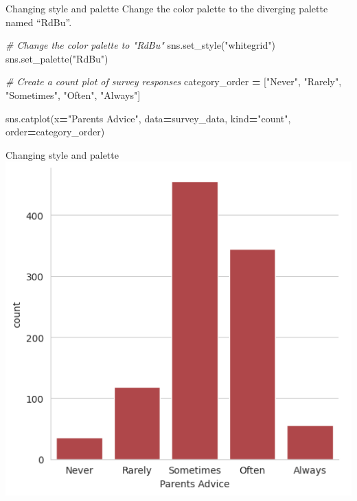\documentclass[
  ignorenonframetext,
]{beamer}
\newenvironment{Shaded}{\begin{snugshade}}{\end{snugshade}}
\newcommand{\CommentTok}[1]{\textcolor[rgb]{0.56,0.35,0.01}{\textit{#1}}}
\newcommand{\NormalTok}[1]{#1}
\newcommand{\OperatorTok}[1]{\textcolor[rgb]{0.81,0.36,0.00}{\textbf{#1}}}
\newcommand{\StringTok}[1]{\textcolor[rgb]{0.31,0.60,0.02}{#1}}
\begin{document}
\begin{frame}[fragile]{Changing style and palette}
\label{changing-style-and-palette-8}
Change the color palette to the diverging palette named ``RdBu''.


\begin{Shaded}
\begin{Highlighting}[]
\CommentTok{\# Change the color palette to "RdBu"}
\NormalTok{sns.set\_style(}\StringTok{"whitegrid"}\NormalTok{)}
\NormalTok{sns.set\_palette(}\StringTok{"RdBu"}\NormalTok{)}

\CommentTok{\# Create a count plot of survey responses}
\NormalTok{category\_order }\OperatorTok{=}\NormalTok{ [}\StringTok{"Never"}\NormalTok{, }\StringTok{"Rarely"}\NormalTok{, }\StringTok{"Sometimes"}\NormalTok{, }
                  \StringTok{"Often"}\NormalTok{, }\StringTok{"Always"}\NormalTok{]}

\NormalTok{sns.catplot(x}\OperatorTok{=}\StringTok{"Parents Advice"}\NormalTok{, }
\NormalTok{            data}\OperatorTok{=}\NormalTok{survey\_data, }
\NormalTok{            kind}\OperatorTok{=}\StringTok{"count"}\NormalTok{, }
\NormalTok{            order}\OperatorTok{=}\NormalTok{category\_order)}
\end{Highlighting}
\end{Shaded}
\end{frame}

\begin{frame}{Changing style and palette}
\label{changing-style-and-palette-9}
\includegraphics{../images/im298.png}
\end{frame}
\end{document}
